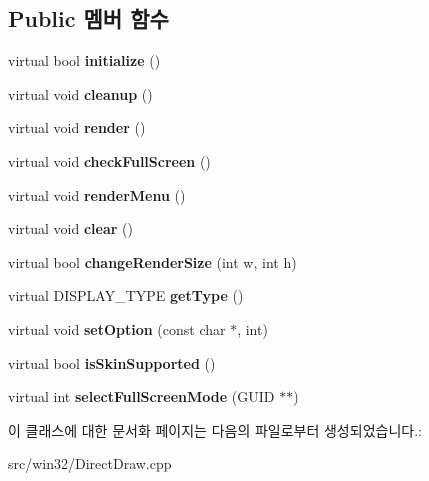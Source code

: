 \subsection*{Public 멤버 함수}
\begin{DoxyCompactItemize}
\item 
\mbox{\label{class_direct_draw_display_a310109ff2530aaa109ed048ede6e1564}} 
virtual bool {\bfseries initialize} ()
\item 
\mbox{\label{class_direct_draw_display_a9ef5e33d516c118742d7cf3b52ed28fc}} 
virtual void {\bfseries cleanup} ()
\item 
\mbox{\label{class_direct_draw_display_ab09489c28cb1fb5aaab0e51824fe3a28}} 
virtual void {\bfseries render} ()
\item 
\mbox{\label{class_direct_draw_display_ada4eacae559651471181ec781dce1716}} 
virtual void {\bfseries check\+Full\+Screen} ()
\item 
\mbox{\label{class_direct_draw_display_a0a207e0d27c3ccf35d0b5b56fe78678e}} 
virtual void {\bfseries render\+Menu} ()
\item 
\mbox{\label{class_direct_draw_display_a90c0576a1ad6b80c1377df94d4eaa1a2}} 
virtual void {\bfseries clear} ()
\item 
\mbox{\label{class_direct_draw_display_a4e91a6dc8d9e32c8f26d11e3879bc850}} 
virtual bool {\bfseries change\+Render\+Size} (int w, int h)
\item 
\mbox{\label{class_direct_draw_display_ab680561928153be1285c826d3e4f0dd7}} 
virtual D\+I\+S\+P\+L\+A\+Y\+\_\+\+T\+Y\+PE {\bfseries get\+Type} ()
\item 
\mbox{\label{class_direct_draw_display_a94010855bad5354842c7c7062ab4ce03}} 
virtual void {\bfseries set\+Option} (const char $\ast$, int)
\item 
\mbox{\label{class_direct_draw_display_af98136de6311fb224288f7e7cbb36106}} 
virtual bool {\bfseries is\+Skin\+Supported} ()
\item 
\mbox{\label{class_direct_draw_display_a10d4f6b14b3f4de2edb60e05a4277d25}} 
virtual int {\bfseries select\+Full\+Screen\+Mode} (G\+U\+ID $\ast$$\ast$)
\end{DoxyCompactItemize}


이 클래스에 대한 문서화 페이지는 다음의 파일로부터 생성되었습니다.\+:\begin{DoxyCompactItemize}
\item 
src/win32/Direct\+Draw.\+cpp\end{DoxyCompactItemize}
